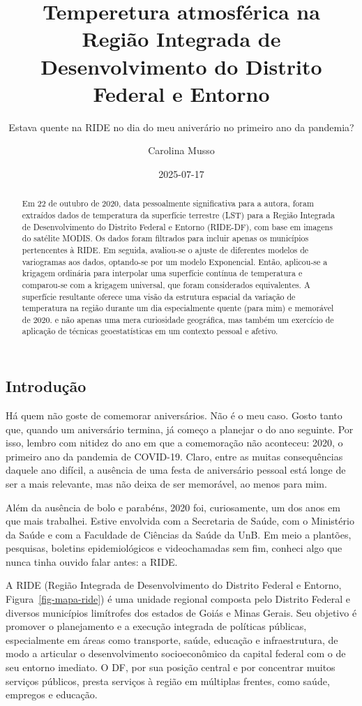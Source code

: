 \documentclass[
  letterpaper,
  DIV=11,
  numbers=noendperiod]{scrartcl}
\title{Temperetura atmosférica na Região Integrada de Desenvolvimento do
Distrito Federal e Entorno}
\subtitle{Estava quente na RIDE no dia do meu aniverário no primeiro ano
da pandemia?}
\author{Carolina Musso}
\date{2025-07-17}
\begin{document}
\maketitle
\begin{abstract}
Em 22 de outubro de 2020, data pessoalmente significativa para a autora,
foram extraídos dados de temperatura da superfície terrestre (LST) para
a Região Integrada de Desenvolvimento do Distrito Federal e Entorno
(RIDE-DF), com base em imagens do satélite MODIS. Os dados foram
filtrados para incluir apenas os municípios pertencentes à RIDE. Em
seguida, avaliou-se o ajuste de diferentes modelos de variogramas aos
dados, optando-se por um modelo Exponencial. Então, aplicou-se a
krigagem ordinária para interpolar uma superfície contínua de
temperatura e comparou-se com a krigagem universal, que foram
considerados equivalentes. A superfície resultante oferece uma visão da
estrutura espacial da variação de temperatura na região durante um dia
especialmente quente (para mim) e memorável de 2020. e não apenas uma
mera curiosidade geográfica, mas também um exercício de aplicação de
técnicas geoestatísticas em um contexto pessoal e afetivo.
\end{abstract}

\subsection{Introdução}\label{introduuxe7uxe3o}

Há quem não goste de comemorar aniversários. Não é o meu caso. Gosto
tanto que, quando um aniversário termina, já começo a planejar o do ano
seguinte. Por isso, lembro com nitidez do ano em que a comemoração não
aconteceu: 2020, o primeiro ano da pandemia de COVID-19. Claro, entre as
muitas consequências daquele ano difícil, a ausência de uma festa de
aniversário pessoal está longe de ser a mais relevante, mas não deixa de
ser memorável, ao menos para mim.

Além da ausência de bolo e parabéns, 2020 foi, curiosamente, um dos anos
em que mais trabalhei. Estive envolvida com a Secretaria de Saúde, com o
Ministério da Saúde e com a Faculdade de Ciências da Saúde da UnB. Em
meio a plantões, pesquisas, boletins epidemiológicos e videochamadas sem
fim, conheci algo que nunca tinha ouvido falar antes: a RIDE.

A RIDE (Região Integrada de Desenvolvimento do Distrito Federal e
Entorno, Figura~\ref{fig-mapa-ride}) é uma unidade regional composta
pelo Distrito Federal e diversos municípios limítrofes dos estados de
Goiás e Minas Gerais. Seu objetivo é promover o planejamento e a
execução integrada de políticas públicas, especialmente em áreas como
transporte, saúde, educação e infraestrutura, de modo a articular o
desenvolvimento socioeconômico da capital federal com o de seu entorno
imediato. O DF, por sua posição central e por concentrar muitos serviços
públicos, presta serviços à região em múltiplas frentes, como saúde,
empregos e educação.
\end{document}
